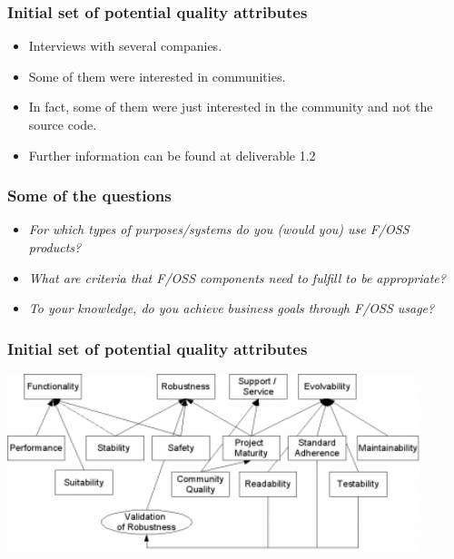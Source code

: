 \documentclass{beamer}
\begin{document}
\begin{frame}
\frametitle{Initial set of potential quality attributes}
\begin{center}
\begin{itemize}
\item Interviews with several companies.
\item Some of them were interested in communities.
\item In fact, some of them were just interested in the community and not the source code.
\item Further information can be found at deliverable 1.2
\end{itemize}
\end{center}
\end{frame}



\begin{frame}
\frametitle{Some of the questions}
\begin{center}
\begin{itemize}
\item\textit{ For which types of purposes/systems do you (would you) use F/OSS products?}
\item \textit{What are criteria that F/OSS components need to fulfill to be appropriate?}
\item\textit{ To your knowledge, do you achieve business goals through F/OSS usage?}
\end{itemize}
\end{center}
\end{frame}


\begin{frame}
\frametitle{Initial set of potential quality attributes}
\begin{center}
\includegraphics[width=0.9\textwidth]{figs/initialqualityattributes.png}
\end{center}
\end{frame}
\end{document}
